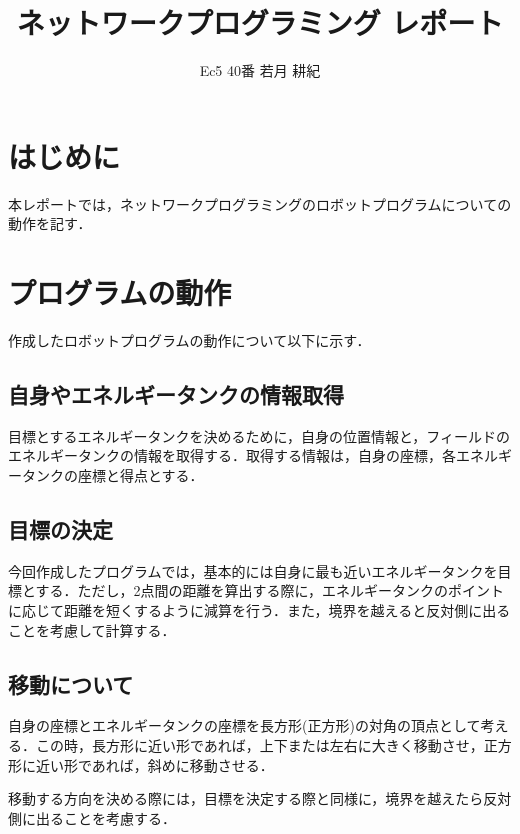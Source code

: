 \documentclass{jsarticle}
\title{\vspace{-3cm}ネットワークプログラミング レポート}
\author{Ec5 40番 若月 耕紀}
\date{}
\begin{document}
\maketitle

\section{はじめに}
本レポートでは，ネットワークプログラミングのロボットプログラムについての動作を記す．

\section{プログラムの動作}
作成したロボットプログラムの動作について以下に示す．

\subsection{自身やエネルギータンクの情報取得}

目標とするエネルギータンクを決めるために，自身の位置情報と，フィールドのエネルギータンクの情報を取得する．取得する情報は，自身の座標，各エネルギータンクの座標と得点とする．

\subsection{目標の決定}

今回作成したプログラムでは，基本的には自身に最も近いエネルギータンクを目標とする．ただし，2点間の距離を算出する際に，エネルギータンクのポイントに応じて距離を短くするように減算を行う．また，境界を越えると反対側に出ることを考慮して計算する．

\subsection{移動について}

自身の座標とエネルギータンクの座標を長方形(正方形)の対角の頂点として考える．この時，長方形に近い形であれば，上下または左右に大きく移動させ，正方形に近い形であれば，斜めに移動させる．

移動する方向を決める際には，目標を決定する際と同様に，境界を越えたら反対側に出ることを考慮する．
\end{document}
